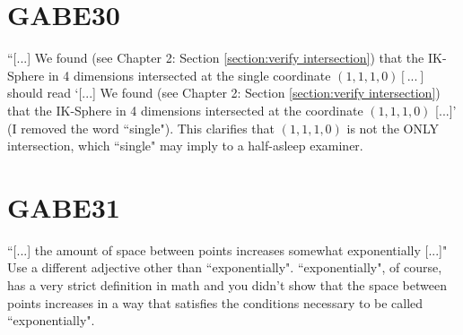 \section{GABE30}
``[...] We found (see Chapter 2: Section \ref{section:verify intersection}) that the IK-Sphere in 4 dimensions intersected at the single coordinate $(1, 1, 1, 0) [...]$ should read `[...] We found (see Chapter 2: Section \ref{section:verify intersection}) that the IK-Sphere in 4 dimensions intersected at the coordinate $(1, 1, 1, 0)$ [...]' (I removed the word ``single"). This clarifies that $(1,1,1,0)$ is not the ONLY intersection, which ``single" may imply to a half-asleep examiner.

\section{GABE31}
``[...] the amount of space between points increases somewhat exponentially [...]" Use a different adjective other than ``exponentially". ``exponentially", of course, has a very strict definition in math and you didn't show that the space between points increases in a way that satisfies the conditions necessary to be called ``exponentially".

